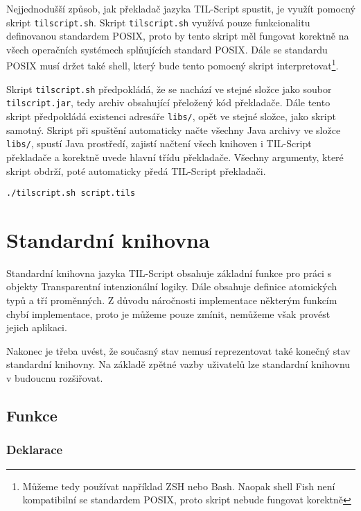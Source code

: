 Nejjednodušší způsob, jak překladač jazyka TIL-Script spustit, je využít pomocný skript
\lstinline{tilscript.sh}. Skript \lstinline{tilscript.sh} využívá pouze funkcionalitu definovanou
standardem POSIX, proto by tento skript měl fungovat korektně na všech operačních systémech
splňujících standard POSIX. Dále se standardu POSIX musí držet také shell, který bude tento pomocný
skript interpretovat\footnote{Můžeme tedy používat například ZSH nebo Bash. Naopak shell Fish není
kompatibilní se standardem POSIX, proto skript nebude fungovat korektně}.

Skript \lstinline{tilscript.sh} předpokládá, že se nachází ve stejné složce jako soubor
\lstinline{tilscript.jar}, tedy archiv obsahující přeložený kód překladače. Dále tento skript
předpokládá existenci adresáře \lstinline{libs/}, opět ve stejné složce, jako skript samotný.
Skript při spuštění automaticky načte všechny Java archivy ve složce \lstinline{libs/}, spustí
Java prostředí, zajistí načtení všech knihoven i TIL-Script překladače a korektně uvede hlavní
třídu překladače. Všechny argumenty, které skript obdrží, poté automaticky předá TIL-Script
překladači.

\begin{lstlisting}[caption={Spuštění překladače za využití pomocného skriptu}]
./tilscript.sh script.tils
\end{lstlisting}

\section{Standardní knihovna}

Standardní knihovna jazyka TIL-Script obsahuje základní funkce pro práci s objekty Transparentní
intenzionální logiky. Dále obsahuje definice atomických typů a tří proměnných. Z důvodu náročnosti
implementace některým funkcím chybí implementace, proto je můžeme pouze zmínit, nemůžeme však
provést jejich aplikaci.

Nakonec je třeba uvést, že současný stav nemusí reprezentovat také konečný stav standardní knihovny.
Na základě zpětné vazby uživatelů lze standardní knihovnu v budoucnu rozšiřovat.

\subsection{Funkce}

\subsubsection{Deklarace}

